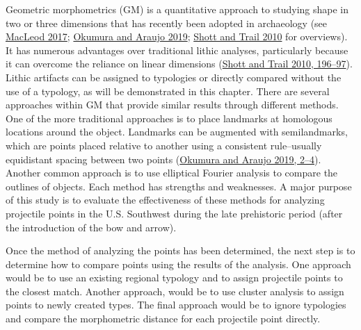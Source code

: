 \documentclass{article}
\begin{document}
Geometric morphometrics (GM) is a quantitative approach to studying
shape in two or three dimensions that has recently been adopted in
archaeology (see \protect\hyperlink{ref-MacLeod2017-yl}{MacLeod 2017};
\protect\hyperlink{ref-Okumura2019-ur}{Okumura and Araujo 2019};
\protect\hyperlink{ref-Shott2010-fn}{Shott and Trail 2010} for
overviews). It has numerous advantages over traditional lithic analyses,
particularly because it can overcome the reliance on linear dimensions
(\protect\hyperlink{ref-Shott2010-fn}{Shott and Trail 2010, 196--97}).
Lithic artifacts can be assigned to typologies or directly compared
without the use of a typology, as will be demonstrated in this chapter.
There are several approaches within GM that provide similar results
through different methods. One of the more traditional approaches is to
place landmarks at homologous locations around the object. Landmarks can
be augmented with semilandmarks, which are points placed relative to
another using a consistent rule--usually equidistant spacing between two
points (\protect\hyperlink{ref-Okumura2019-ur}{Okumura and Araujo 2019,
2--4}). Another common approach is to use elliptical Fourier analysis to
compare the outlines of objects. Each method has strengths and
weaknesses. A major purpose of this study is to evaluate the
effectiveness of these methods for analyzing projectile points in the
U.S. Southwest during the late prehistoric period (after the
introduction of the bow and arrow).

Once the method of analyzing the points has been determined, the next
step is to determine how to compare points using the results of the
analysis. One approach would be to use an existing regional typology and
to assign projectile points to the closest match. Another approach,
would be to use cluster analysis to assign points to newly created
types. The final approach would be to ignore typologies and compare the
morphometric distance for each projectile point directly.
\end{document}
